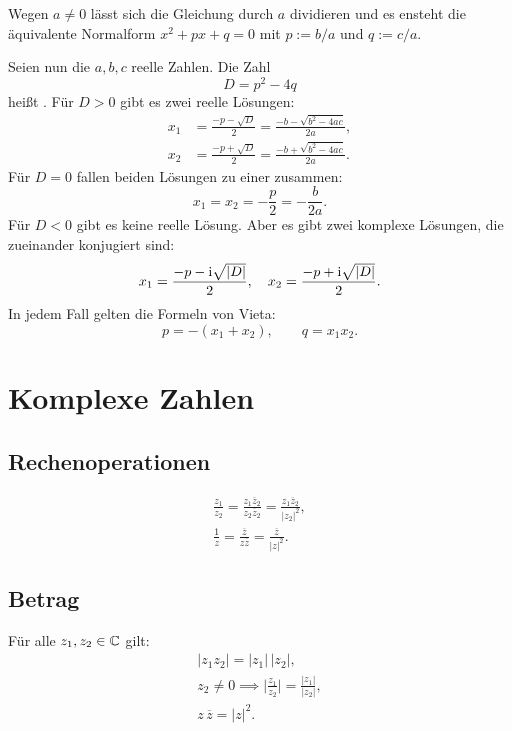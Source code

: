 Wegen $a\ne 0$ lässt sich die Gleichung durch $a$ dividieren
und es ensteht die äquivalente Normalform $x^2+px+q=0$
mit $p:=b/a$ und $q:=c/a$.

Seien nun die $a,b,c$ reelle Zahlen. Die Zahl
\begin{equation}
D = p^2-4q
\end{equation}
heißt . Für $D>0$ gibt es zwei reelle Lösungen:
\begin{align}
x_1 &= \frac{-p-\sqrt{D}}{2} = \frac{-b-\sqrt{b^2-4ac}}{2a},\\
x_2 &= \frac{-p+\sqrt{D}}{2} = \frac{-b+\sqrt{b^2-4ac}}{2a}.
\end{align}
Für $D=0$ fallen beiden Lösungen zu einer 
zusammen:
\begin{equation}
x_1 = x_2 = -\frac{p}{2} = -\frac{b}{2a}.
\end{equation}
Für $D<0$ gibt es keine reelle Lösung. Aber es gibt zwei komplexe
Lösungen, die zueinander konjugiert sind:
\begin{equation}
x_1 = \frac{-p-\mathrm i\sqrt{|D|}}{2},\quad
x_2 = \frac{-p+\mathrm i\sqrt{|D|}}{2}.
\end{equation}
In jedem Fall gelten die Formeln von Vieta:
\begin{equation}
p = -(x_1+x_2),\qquad q = x_1 x_2.
\end{equation}

\section{Komplexe Zahlen}
\subsection{Rechenoperationen}

\begin{gather}
\frac{z_1}{z_2}
= \frac{z_1\overline z_2}{z_2\overline z_2}
= \frac{z_1\overline z_2}{|z_2|^2},\\
\frac{1}{z} = \frac{\overline z}{z\overline z}
= \frac{\overline z}{|z|^2}.
\end{gather}

\subsection{Betrag}
Für alle $z_1,z_2\in\mathbb C$ gilt:
\begin{gather}
|z_1z_2| = |z_1|\,|z_2|,\\
z_2\ne 0\implies \Big|\frac{z_1}{z_2}\Big|
= \frac{|z_1|}{|z_2|},\\
z\,\overline z = |z|^2.
\end{gather}


